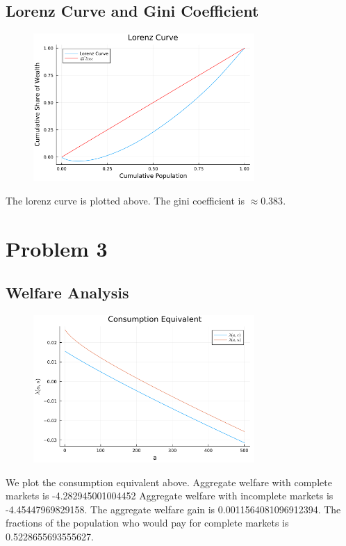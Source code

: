 \documentclass[10pt]{article}
\begin{document}
\newpage
\subsection{Lorenz Curve and Gini Coefficient}
\begin{figure}[!h]
    \centering
    \includegraphics[width = 0.75\textwidth]{lorenz_curve.png}
\end{figure}

The lorenz curve is plotted above. The gini coefficient is $\approx 0.383$. 

\section{Problem 3}

\subsection{Welfare Analysis}

\begin{figure}[!h]
    \centering 
    \includegraphics[width = 0.75\textwidth]{consumption_equiv.png}
\end{figure}

We plot the consumption equivalent above. Aggregate welfare with complete markets is -4.282945001004452
Aggregate welfare with incomplete markets is -4.45447969829158.
The aggregate welfare gain is 0.0011564081096912394.
The fractions of the population who would pay for complete markets is 0.5228655693555627.
\end{document}
